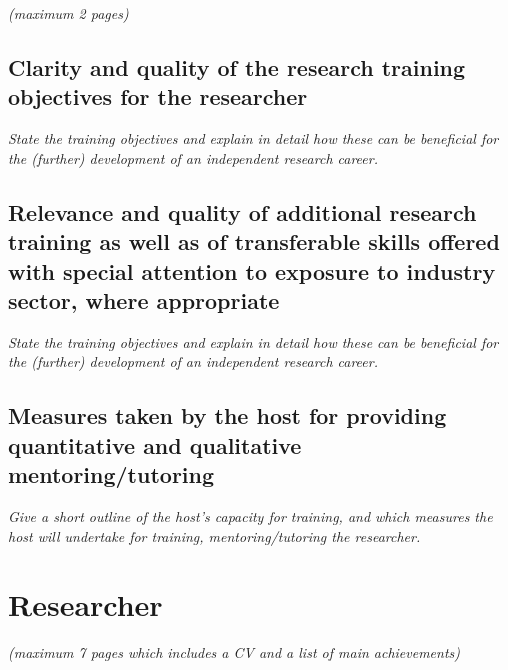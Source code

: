 \documentclass[a4paper,11pt]{article}
\newenvironment{xcomment}{\em}{}
\begin{document}
\begin{xcomment}
 (maximum 2 pages)
\end{xcomment}

\subsection{Clarity and quality of the research training objectives for the researcher}

\begin{xcomment}
 State the training objectives and explain in detail how these can be beneficial for the (further)
development of an independent research career.
\end{xcomment}

\subsection{Relevance and quality of additional research training as well as of transferable skills offered with special attention to exposure to industry sector, where appropriate}

\begin{xcomment}
 State the training objectives and explain in detail how these can be beneficial for the (further)
development of an independent research career.
\end{xcomment}

\subsection{Measures taken by the host for providing quantitative and qualitative mentoring/tutoring}

\begin{xcomment}
 Give a short outline of the host's capacity for training, and which measures the host will
undertake for training, mentoring/tutoring the researcher.
\end{xcomment}


\newpage
\section{Researcher}
\begin{xcomment}  
(maximum 7 pages which includes a CV and a list of main achievements)
\end{xcomment}
\end{document}
